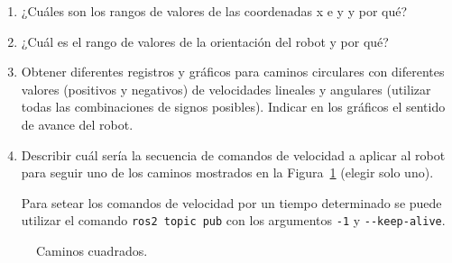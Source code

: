 \documentclass[tp]{lcc}
\begin{document}
\begin{enumerate}

\item ¿Cuáles son los rangos de valores de las coordenadas x e y y por qué?

\item  ¿Cuál es el rango de valores de la orientación del robot y por qué?

\item Obtener diferentes registros y gráficos para caminos circulares con diferentes valores (positivos y negativos) de velocidades lineales y angulares (utilizar todas las combinaciones de signos posibles). Indicar en los gráficos el sentido de avance del robot.

\item Describir cuál sería la secuencia de comandos de velocidad a aplicar al robot para seguir uno de los caminos mostrados en la Figura~\ref{fig:trajectories} (elegir solo uno).

\begin{nota}
	Para setear los comandos de velocidad por un tiempo determinado se puede utilizar el comando \lstinline[style=bash]{ros2 topic pub} con los argumentos \lstinline[style=bash]{-1} y \lstinline[style=bash]{--keep-alive}.
\end{nota}

\end{enumerate}


\begin{figure}[!htbp]
    \centering
    \hspace{3cm}
    \caption{Caminos cuadrados.}
    \label{fig:trajectories}
\end{figure}
\end{document}
